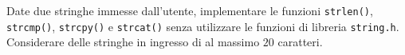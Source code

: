 \begin{Exercise}[label={ex:strcat}]
  Date due stringhe immesse dall'utente, implementare le funzioni \texttt{strlen()}, \texttt{strcmp()}, \texttt{strcpy()} e \texttt{strcat()} senza utilizzare le funzioni di libreria \texttt{string.h}. Considerare delle stringhe in ingresso di al massimo $20$ caratteri.
\end{Exercise}

\begin{Answer}[ref={ex:strcat}]
  
  
  
  
\end{Answer}
